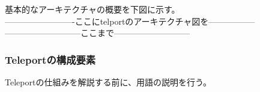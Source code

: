 \documentclass[12pt,a4paper,titlepage]{jsarticle}
\begin{document}
基本的なアーキテクチャの概要を下図に示す。
\\-------------------------ここにtelportのアーキテクチャ図を-----------------
\\---------------------------ここまで---------------------------\par




\subsubsection*{Teleportの構成要素}
Teleportの仕組みを解説する前に、用語の説明を行う。

    
\end{document}
